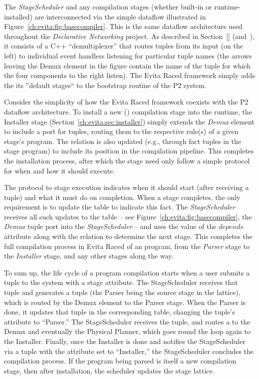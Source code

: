 The {\em StageScheduler} and any compilation stages (whether built-in or
runtime-installed) are interconnected via the simple dataflow illustrated in
Figure~\ref{ch:evita:fig:basecompiler}.  This is the same dataflow architecture
used throughout the {\em Declarative Networking} project.  As described in
Section~\ref{} (and~\cite{p2:sosp}), it consists of a C++ ``demultiplexer''
that routes tuples from its input (on the left) to individual event handlers
listening for particular tuple names (the arrows leaving the Demux element in
the figure contain the name of the tuple for which the four components to the
right listen).  The Evita Raced framework simply adds the its ''default
stages`` to the bootstrap routine of the P2 system.

Consider the simplicity of how the Evita Raced framework coexists with the P2
dataflow architecture.  To install a new (\OVERLOG) compilation stage into the
runtime, the Installer stage (Section~\ref{ch:evita:sec:installer}) simply extends
the {\em Demux} element to include a port for 
tuples, routing them to the respective rule(s) of a given stage's \OVERLOG
program. The  relation is also updated (e.g., through fact tuples
in the \OVERLOG stage program) to include its position in the compilation pipeline.
This completes the installation process, after which the \OVERLOG stage need only 
follow a simple protocol for when and how it should execute. 

The protocol to stage execution indicates when it should start (after receiving
a  tuple) and what it must do on completion.  When a
stage completes, the only requirement is to update the  table to
indicate this fact.  The {\em StageScheduler} receives all such updates to the
 table -- see Figure~\ref{ch:evita:fig:basecompiler}, the {\em
Demux}  tuple port into the {\em StageScheduler} -- and uses the
value of the  $depends$ attribute along with the 
relation to determine the next stage.  This completes the full compilation
process in Evita Raced of an \OVERLOG program, from the {\em Parser} stage to the {\em
Installer} stage, and any other stages along the way.

To sum up, the life cycle of a program compilation starts when a user submits a
 tuple to the system with a  stage attribute.  The
StageScheduler receives that  tuple and generates a
 tuple (the Parser being the source stage in the
lattice), which is routed by the Demux element to the Parser stage.  When the
Parser is done, it updates that  tuple in the corresponding table,
changing the tuple's attribute to ``Parser.'' The StageScheduler receives the
 tuple, and routes a  to the Demux and
eventually the Physical Planner, which goes round the loop again to the
Installer.  Finally, once the Installer is done and notifies the StageScheduler
via a  tuple with the  attribute set to ``Installer,''
the StageScheduler concludes the compilation process.  If the \OVERLOG program
being parsed is itself a new compilation stage, then after installation, the
scheduler updates the stage lattice.


